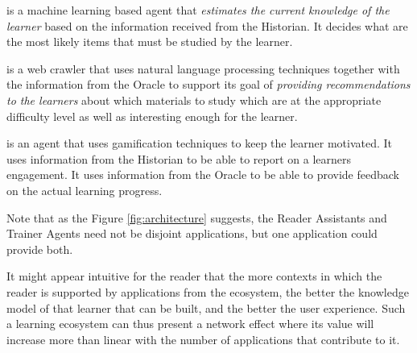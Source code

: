 \begin{itemize}
\begin{itemize}
			 is a machine learning based agent that {\em estimates the current knowledge of the learner} based on the information received from the Historian. It decides what are the most likely items that must be studied by the learner. 


			 is a web crawler that uses natural language processing techniques together with the information from the Oracle to support its goal of {\em providing recommendations to the learners} about which materials to study which are at the appropriate difficulty level as well as interesting enough for the learner.

			 is an agent that uses gamification techniques to keep the learner motivated. It uses information from the Historian to be able to report on a learners engagement. It uses information from the Oracle to be able to provide feedback on the actual learning progress. 

		\end{itemize}


	


	
\end{itemize}

Note that as the Figure \ref{fig:architecture} suggests, the Reader Assistants and Trainer Agents need not be disjoint applications, but one application could provide both.

It might appear intuitive for the reader that the more contexts in which the reader is supported by applications from the ecosystem, the better the knowledge model of that learner that can be built, and the better the user experience. Such a learning ecosystem can thus present a network effect where its value will increase more than linear with the number of applications that contribute to it.



